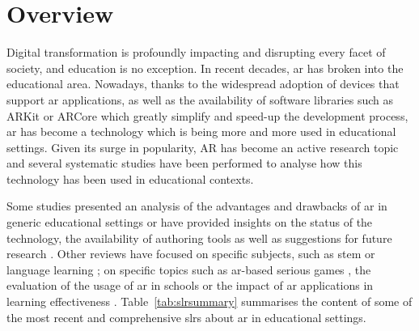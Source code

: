 \section{Overview} \label{sota:overview}
Digital transformation is profoundly impacting and disrupting every facet of society, and education is no exception. In recent decades, \gls{ar} has broken into the educational area. Nowadays, thanks to the widespread adoption of devices that support \gls{ar} applications, as well as the availability of software libraries such as ARKit or ARCore which greatly simplify and speed-up the development process, \gls{ar} has become a technology which is being more and more used in educational settings. Given its surge in popularity, AR has become an active research topic and several systematic studies have been performed to analyse how this technology has been used in educational contexts.

Some studies presented an analysis of the advantages and drawbacks of \gls{ar} in generic educational settings \citep{akccayir2017advantages, radu2014augmented, diegmann2015benefits} or have provided insights on the status of the technology, the availability of authoring tools as well as suggestions for future research \citep{cheng2013affordances, arici2019research, bacca2014augmented, pellas2019augmenting, dengel2022review}. Other reviews have focused on specific subjects, such as \gls{stem} \citep{ibanez2018augmented, nielsen2016augmented, ahmad2020augmented, sirakaya2022augmented} or language learning \citep{majid2021systematic, khoshnevisan2018augmented}; on specific topics such as \gls{ar}-based serious games \citep{li2017augmented, bartolome2011can, laine2018mobile}, the evaluation of the usage of \gls{ar} in schools \citep{da2019perspectives, chen2017review} or the impact of \gls{ar} applications in learning effectiveness \citep{garzon2019systematic, chang2022ten}. Table~\ref{tab:slrsummary} summarises the content of some of the most recent and comprehensive \glspl{slr} about \gls{ar} in educational settings.


